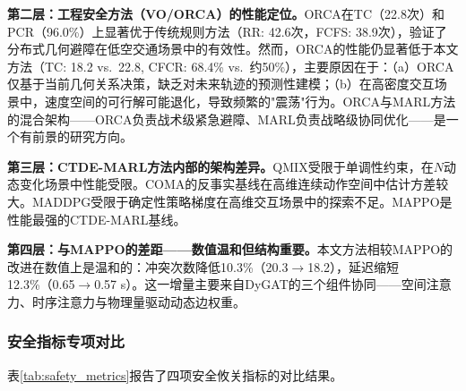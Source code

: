 \documentclass[12pt,a4paper,UTF8]{ctexart}
\begin{document}
\textbf{第二层：工程安全方法（VO/ORCA）的性能定位。}ORCA在TC（22.8次）和PCR（96.0\%）上显著优于传统规则方法（RR: 42.6次，FCFS: 38.9次），验证了分布式几何避障在低空交通场景中的有效性。然而，ORCA的性能仍显著低于本文方法（TC: 18.2 vs.\ 22.8, CFCR: 68.4\% vs.\ 约50\%），主要原因在于：（a）ORCA仅基于当前几何关系决策，缺乏对未来轨迹的预测性建模；（b）在高密度交互场景中，速度空间的可行解可能退化，导致频繁的"震荡"行为。ORCA与MARL方法的混合架构——ORCA负责战术级紧急避障、MARL负责战略级协同优化——是一个有前景的研究方向。

\textbf{第三层：CTDE-MARL方法内部的架构差异。}QMIX受限于单调性约束，在$N$动态变化场景中性能受限。COMA的反事实基线在高维连续动作空间中估计方差较大。MADDPG受限于确定性策略梯度在高维交互场景中的探索不足。MAPPO是性能最强的CTDE-MARL基线。

\textbf{第四层：与MAPPO的差距——数值温和但结构重要。}本文方法相较MAPPO的改进在数值上是温和的：冲突次数降低10.3\%（20.3$\to$18.2），延迟缩短12.3\%（0.65$\to$0.57 s）。这一增量主要来自DyGAT的三个组件协同——空间注意力、时序注意力与物理量驱动动态边权重。

\subsubsection{安全指标专项对比}

表\ref{tab:safety_metrics}报告了四项安全攸关指标的对比结果。
\end{document}
